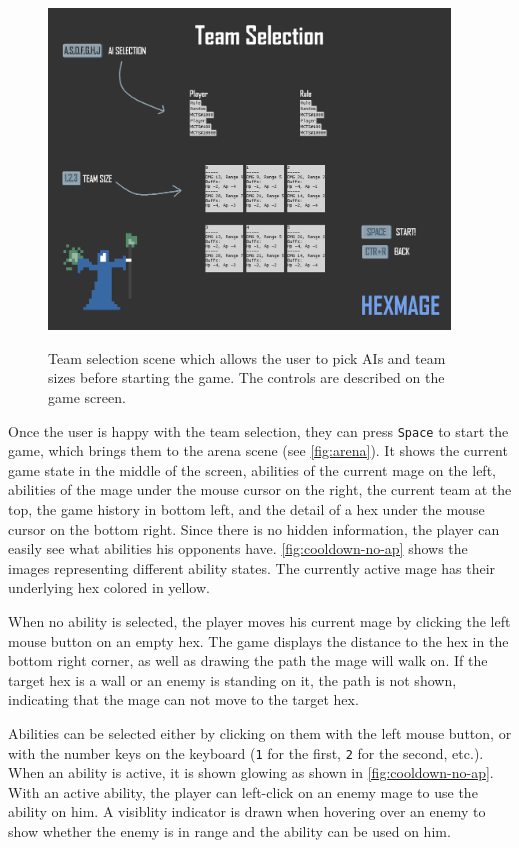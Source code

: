 \begin{figure}
	\centering
	\includegraphics[width=0.95\textwidth]{img/team-selection.png}
	\label{fig:team-selection}
	\caption{Team selection scene which allows the user to pick AIs and team sizes before starting the game. The controls are described on the game screen.}
\end{figure}

Once the user is happy with the team selection, they can press \verb|Space| to start the game, which brings them to the arena scene (see \autoref{fig:arena}). It shows the current game state in the middle of the screen, abilities of the current mage on the left, abilities of the mage under the mouse cursor on the right, the current team at the top, the game history in bottom left, and the detail of a hex under the mouse cursor on the bottom right. Since there is no hidden information, the player can easily see what abilities his opponents have. \autoref{fig:cooldown-no-ap} shows the images representing different ability states. The currently active mage has their underlying hex colored in yellow.

When no ability is selected, the player moves his current mage by clicking the left mouse button on an empty hex. The game displays the distance to the hex in the bottom right corner, as well as drawing the path the mage will walk on. If the target hex is a wall or an enemy is standing on it, the path is not shown, indicating that the mage can not move to the target hex.

Abilities can be selected either by clicking on them with the left mouse button, or with the number keys on the keyboard (\verb|1| for the first, \verb|2| for the second, etc.). When an ability is active, it is shown glowing as shown in \autoref{fig:cooldown-no-ap}. With an active ability, the player can left-click on an enemy mage to use the ability on him. A visiblity indicator is drawn when hovering over an enemy to show whether the enemy is in range and the ability can be used on him.

